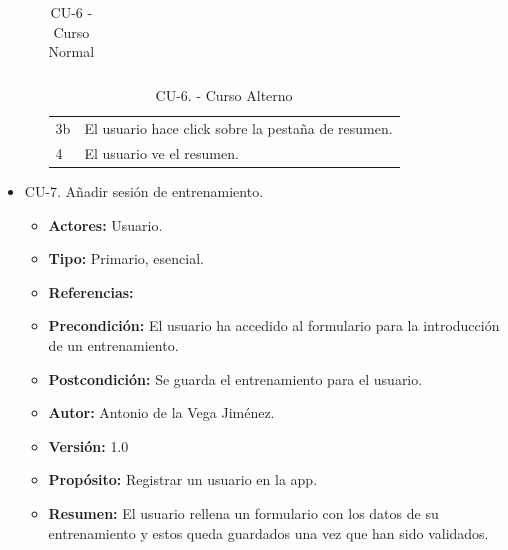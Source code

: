 \begin{itemize}
\begin{itemize}
\begin{table}[H]
\begin{tabularx}{\textwidth}{|l|X|l|X|}
      \end{tabularx}
      \caption{CU-6 - Curso Normal}
      \label{my-label}
    \end{table}
    \begin{table}[H]
      \centering
      \begin{tabularx}{\textwidth}{|l|X|}
       \hline
       \rowcolor[HTML]{C0C0C0} 
       \multicolumn{2}{|l|}{\cellcolor[HTML]{C0C0C0}Curso Alterno} \\ \hline
       \rowcolor[HTML]{FFFFFF} 
              3b                      & El usuario hace click sobre la pestaña de resumen.                            \\ \hline
              4                     & El usuario ve el resumen.                            \\ \hline
      \end{tabularx}
      \caption{CU-6. - Curso Alterno}
      \label{my-label}
    \end{table}
  \end{itemize}
  \item CU-7. Añadir sesión de entrenamiento.
  \begin{itemize}
    \item \textbf{Actores:} Usuario.
    \item \textbf{Tipo:} Primario, esencial.
    \item \textbf{Referencias:}
    \item \textbf{Precondición:} El usuario ha accedido al formulario para la introducción de un entrenamiento.
    \item \textbf{Postcondición:} Se guarda el entrenamiento para el usuario.
    \item \textbf{Autor:} Antonio de la Vega Jiménez.
    \item \textbf{Versión:} 1.0
    \item \textbf{Propósito:} Registrar un usuario en la app.
    \item \textbf{Resumen:} El usuario rellena un formulario con los datos de su entrenamiento y estos queda guardados una vez que han sido validados.
    \begin{table}[H]

\end{table}
\end{itemize}
\end{itemize}
